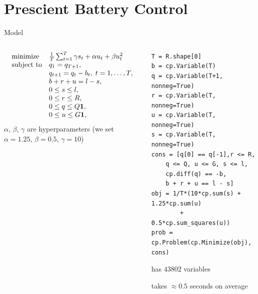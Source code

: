 \documentclass[aspectratio=169,11pt]{beamer}
\begin{document}
\section{Prescient Battery Control}
\begin{frame}[fragile]{Model}
    \begin{columns}
        \begin{column}{0.46\textwidth}
    \[
        \begin{array}{ll}
            \mbox{minimize}   &  \frac{1}{T}\sum_{t=1}^{T} \gamma s_t + \alpha u_t + \beta u_t^2 \\
            \mbox{subject to} & q_1 = q_{T+1}, \\
            & q_{t+1} = q_t - b_t, \; t = 1, \ldots, T, \\
            & b + r + u = l-s, \\
            & 0 \leq s \leq l, \\
            & 0 \leq r \leq R, \\
            & 0 \leq q \leq Q \mathbf 1, \\
            & 0 \leq u \leq G \mathbf 1, \\
        \end{array}
    \]
    $\alpha$, $\beta$, $\gamma$ are hyperparameters
    (we set $\alpha = 1.25$, $\beta = 0.5$, $\gamma = 10$)
    \vfill
    \end{column}
    \begin{column}{0.54\textwidth}
    \vfill
\begin{lstlisting}[language=mypython, basicstyle=\footnotesize\ttfamily, belowskip=0em]
T = R.shape[0]
b = cp.Variable(T)
q = cp.Variable(T+1, nonneg=True)
r = cp.Variable(T, nonneg=True)
u = cp.Variable(T, nonneg=True)
s = cp.Variable(T, nonneg=True)
cons = [q[0] == q[-1],r <= R,
    q <= Q, u <= G, s <= l,
    cp.diff(q) == -b,
    b + r + u == l - s]
obj = 1/T*(10*cp.sum(s) + 1.25*cp.sum(u) 
        + 0.5*cp.sum_squares(u))
prob = cp.Problem(cp.Minimize(obj), cons)
\end{lstlisting}
    \BIT
    \item has $43802$ variables
    \item takes $\approx0.5$ seconds on average
    \EIT
    \end{column}
    \end{columns}
\end{frame}
\end{document}
